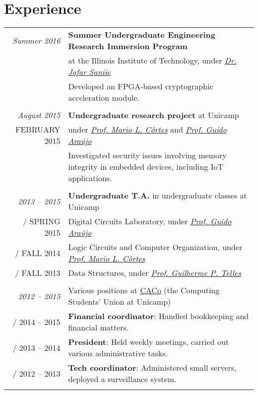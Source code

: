 \documentclass[a4paper,10pt]{article}
\makeatletter
\def\fakesc#1{%
  \begingroup%
  \xdef\fake@name{\csname\curr@fontshape/\f@size\endcsname}%
  \fontsize{\fontdimen8\fake@name}{\baselineskip}\selectfont%
  \uppercase{#1}%
  \endgroup%
}
\renewcommand{\textsc}{\fakesc}
\makeatother
\begin{document}
\section{Experience}

\begin{tabular}{r|p{11cm}}

  \emph{Summer 2016} & \textbf{Summer Undergraduate Engineering Research Immersion Program} \\
                     &at the Illinois Institute of Technology, under \href{https://engineering.iit.edu/faculty/jafar-saniie}{\emph{Dr. Jafar Saniie}}\\
                     & \footnotesize {Developed an FPGA-based cryptographic acceleration module.}\\
  \multicolumn{2}{c}{} \\


  \emph{August 2015} & \textbf{Undergraduate research project} at Unicamp\\
  \textsc{February 2015} & under \href{http://www.ic.unicamp.br/~cortes/}{\emph{Prof. Mario L. Côrtes}} and \href{http://guidoaraujo.wordpress.com/}{\emph{Prof. Guido Araújo}}\\
                     & \footnotesize {Investigated security issues involving memory integrity in embedded devices, including IoT applications.}\\
  \multicolumn{2}{c}{} \\

  \emph{2013 -- 2015} & \textbf{Undergraduate T.A.} in undergraduate classes at Unicamp \\
  \textsc{Spring 2015} & \footnotesize{Digital Circuits Laboratory, under \href{http://guidoaraujo.wordpress.com/}{\emph{Prof. Guido Araújo}}}\\
  \textsc{Fall 2014} & \footnotesize{Logic Circuits and Computer Organization, under \href{http://www.ic.unicamp.br/~cortes/}{\emph{Prof. Mario L. Côrtes}}}\\
  \textsc{Fall 2013} & \footnotesize{Data Structures, under \href{http://ic.unicamp.br/~gpt/}{\emph{Prof. Guilherme P. Telles}}}\\
  \multicolumn{2}{c}{}\\

  \emph{2012 -- 2015} & Various positions at \href{http://www.caco.ic.unicamp.br}{CACo} \footnotesize{(the Computing Students' Union at Unicamp)} \\
  \textsc{2014 -- 2015} & \footnotesize{\textbf{Financial coordinator}: Handled bookkeeping and financial matters.}\\
  \textsc{2013 -- 2014} & \footnotesize{\textbf{President}: Held weekly meetings, carried out various administrative tasks.}\\
  \textsc{2012 -- 2013} & \footnotesize{\textbf{Tech coordinator}: Administered small servers, deployed a surveillance system.}\\
  \multicolumn{2}{c}{} \\

\end{tabular}
\end{document}
